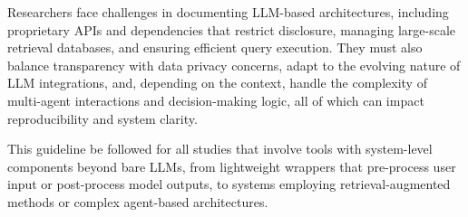 
Researchers face challenges in documenting LLM-based architectures, including proprietary APIs and dependencies that restrict disclosure, managing large-scale retrieval databases, and ensuring efficient query execution.
They must also balance transparency with data privacy concerns, adapt to the evolving nature of LLM integrations, and, depending on the context, handle the complexity of multi-agent interactions and decision-making logic, all of which can impact reproducibility and system clarity.


This guideline \must be followed for all studies that involve tools with system-level components beyond bare LLMs, from lightweight wrappers that pre-process user input or post-process model outputs, to systems employing retrieval-augmented methods or complex agent-based architectures.
